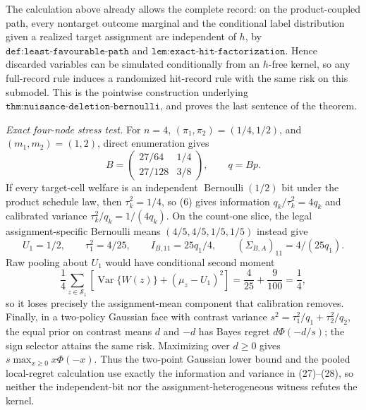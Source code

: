 The calculation above already allows the complete record: on the product-coupled path, every nontarget outcome marginal and the conditional label distribution given a realized target assignment are independent of \(h\), by \(\texttt{def:least-favourable-path}\) and \(\texttt{lem:exact-hit-factorization}\).  Hence discarded variables can be simulated conditionally from an \(h\)-free kernel, so any full-record rule induces a randomized hit-record rule with the same risk on this submodel.  This is the pointwise construction underlying \(\texttt{thm:nuisance-deletion-bernoulli}\), and proves the last sentence of the theorem.

\emph{Exact four-node stress test.}
For \(n=4\), \((\pi_1,\pi_2)=(1/4,1/2)\), and \((m_1,m_2)=(1,2)\), direct enumeration gives
\[
 B=\begin{pmatrix}27/64&1/4\\[2pt]27/128&3/8\end{pmatrix},
 \qquad q=Bp.                                                       \tag{27}
\]
If every target-cell welfare is an independent \(\operatorname{Bernoulli}(1/2)\) bit under the product schedule law, then \(\tau_k^2=1/4\), so (6) gives information \(q_k/\tau_k^2=4q_k\) and calibrated variance \(\tau_k^2/q_k=1/(4q_k)\).  On the count-one slice, the legal assignment-specific Bernoulli means \((4/5,4/5,1/5,1/5)\) instead give
\[
 U_1=1/2,\qquad \tau_1^2=4/25,\qquad
 I_{B,11}=25q_1/4,\qquad (\Sigma_{B,A})_{11}=4/(25q_1).             \tag{28}
\]
Raw pooling about \(U_1\) would have conditional second moment
\[
 \frac14\sum_{z\in\mathcal S_1}
 \left[\operatorname{Var}\{W(z)\}+(\mu_z-U_1)^2\right]
 =\frac4{25}+\frac9{100}=\frac14,
\]
so it loses precisely the assignment-mean component that calibration removes.  Finally, in a two-policy Gaussian face with contrast variance
\(s^2=\tau_1^2/q_1+\tau_2^2/q_2\), the equal prior on contrast means \(d\) and \(-d\) has Bayes regret \(d\Phi(-d/s)\); the sign selector attains the same risk.  Maximizing over \(d\geq0\) gives \(s\max_{x\geq0}x\Phi(-x)\).  Thus the two-point Gaussian lower bound and the pooled local-regret calculation use exactly the information and variance in (27)--(28), so neither the independent-bit nor the assignment-heterogeneous witness refutes the kernel.